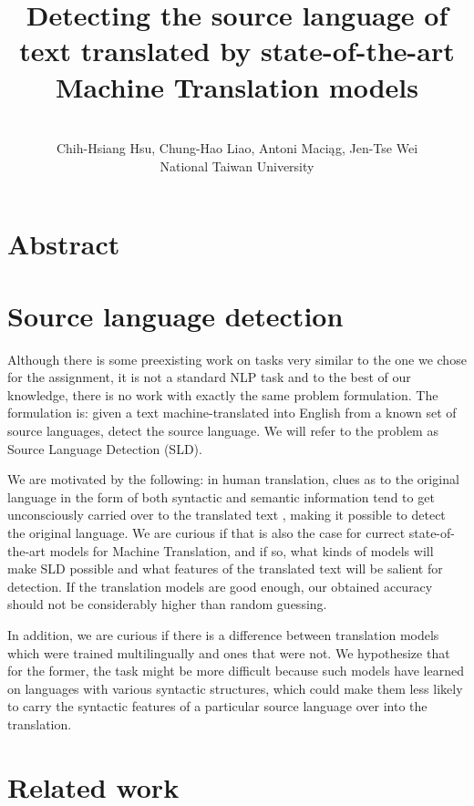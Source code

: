\documentclass[twocolumn]{article}
\title{{\Huge \textbf{Detecting the source language of text translated by state-of-the-art Machine Translation models}} \\ }
\author{ \\ Chih-Hsiang Hsu, Chung-Hao Liao, Antoni Maciąg, Jen-Tse Wei \\ National Taiwan University}
\date{}
\begin{document}
\maketitle

\section*{Abstract}

\section*{Source language detection}

Although there is some preexisting work on tasks very similar to the one we chose for the assignment, it is not a standard NLP task and to the best of our knowledge, there is no work with exactly the same problem formulation. The formulation is: given a text machine-translated into English from a known set of source languages, detect the source language. We will refer to the problem as Source Language Detection (SLD).

We are motivated by the following: in human translation, clues as to the original language in the form of both syntactic and semantic information tend to get unconsciously carried over to the translated text \cite{literary}, making it possible to detect the original language. We are curious if that is also the case for currect state-of-the-art models for Machine Translation, and if so, what kinds of models will make SLD possible and what features of the translated text will be salient for detection. If the translation models are good enough, our obtained accuracy should not be considerably higher than random guessing.

In addition, we are curious if there is a difference between translation models which were trained multilingually and ones that were not. We hypothesize that for the former, the task might be more difficult because such models have learned on languages with various syntactic structures, which could make them less likely to carry the syntactic features of a particular source language over into the translation.


\section*{Related work}
\end{document}
